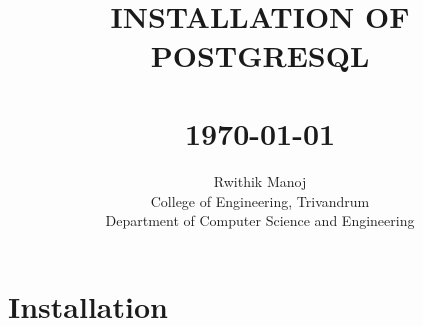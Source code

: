 \documentclass[10pt,a4paper,titlepage]{report}
\begin{document}
{\selectfont
\title{ \normalsize \textsc{}
\\ [2.0cm]
\hrulefill \\
\LARGE \textbf{\uppercase{installation of postgresql}\\
\hrulefill \\ [0.5cm]
\normalsize \today \vspace*{5\baselineskip}}
}

\date{}

\author{
	Rwithik Manoj \\ 
	College of Engineering, Trivandrum \\
	Department of Computer Science and Engineering }

\maketitle
\tableofcontents
\newpage

\sectionfont{\scshape}

\section{Installation}

}
\end{document}
